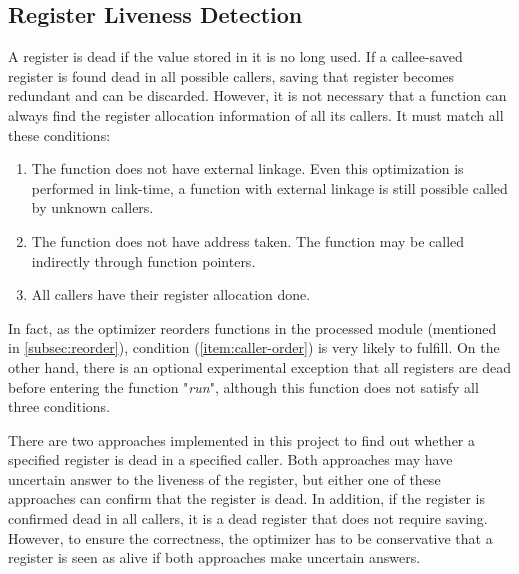 \documentclass[acmsmall]{acmart}
\begin{document}
\subsection{Register Liveness Detection}
\label{subsec:liveness}
A register is dead if the value stored in it is no long used. If a callee-saved register is found dead in all possible callers, saving that register becomes redundant and can be discarded. However, it is not necessary that a function can always find the register allocation information of all its callers. It must match all these conditions:
\begin{enumerate}
	\item The function does not have external linkage. Even this optimization is performed in link-time, a function with external linkage is still possible called by unknown callers.
	\item The function does not have address taken. The function may be called indirectly through function pointers.
	\item \label{item:caller-order} All callers have their register allocation done.
\end{enumerate}
In fact, as the optimizer reorders functions in the processed module (mentioned in \ref{subsec:reorder}), condition (\ref{item:caller-order}) is very likely to fulfill. On the other hand, there is an optional experimental exception that all registers are dead before entering the function "\textit{run}", although this function does not satisfy all three conditions.

There are two approaches implemented in this project to find out whether a specified register is dead in a specified caller. Both approaches may have uncertain answer to the liveness of the register, but either one of these approaches can confirm that the register is dead. In addition, if the register is confirmed dead in all callers, it is a dead register that does not require saving. However, to ensure the correctness, the optimizer has to be conservative that a register is seen as alive if both approaches make uncertain answers.
\end{document}
